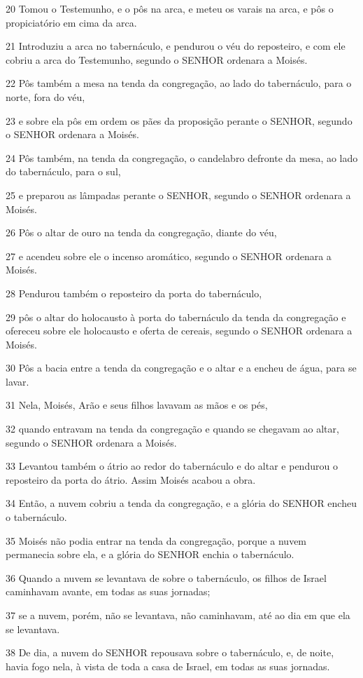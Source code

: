\par 20 Tomou o Testemunho, e o pôs na arca, e meteu os varais na arca, e pôs o propiciatório em cima da arca.
\par 21 Introduziu a arca no tabernáculo, e pendurou o véu do reposteiro, e com ele cobriu a arca do Testemunho, segundo o SENHOR ordenara a Moisés.
\par 22 Pôs também a mesa na tenda da congregação, ao lado do tabernáculo, para o norte, fora do véu,
\par 23 e sobre ela pôs em ordem os pães da proposição perante o SENHOR, segundo o SENHOR ordenara a Moisés.
\par 24 Pôs também, na tenda da congregação, o candelabro defronte da mesa, ao lado do tabernáculo, para o sul,
\par 25 e preparou as lâmpadas perante o SENHOR, segundo o SENHOR ordenara a Moisés.
\par 26 Pôs o altar de ouro na tenda da congregação, diante do véu,
\par 27 e acendeu sobre ele o incenso aromático, segundo o SENHOR ordenara a Moisés.
\par 28 Pendurou também o reposteiro da porta do tabernáculo,
\par 29 pôs o altar do holocausto à porta do tabernáculo da tenda da congregação e ofereceu sobre ele holocausto e oferta de cereais, segundo o SENHOR ordenara a Moisés.
\par 30 Pôs a bacia entre a tenda da congregação e o altar e a encheu de água, para se lavar.
\par 31 Nela, Moisés, Arão e seus filhos lavavam as mãos e os pés,
\par 32 quando entravam na tenda da congregação e quando se chegavam ao altar, segundo o SENHOR ordenara a Moisés.
\par 33 Levantou também o átrio ao redor do tabernáculo e do altar e pendurou o reposteiro da porta do átrio. Assim Moisés acabou a obra.
\par 34 Então, a nuvem cobriu a tenda da congregação, e a glória do SENHOR encheu o tabernáculo.
\par 35 Moisés não podia entrar na tenda da congregação, porque a nuvem permanecia sobre ela, e a glória do SENHOR enchia o tabernáculo.
\par 36 Quando a nuvem se levantava de sobre o tabernáculo, os filhos de Israel caminhavam avante, em todas as suas jornadas;
\par 37 se a nuvem, porém, não se levantava, não caminhavam, até ao dia em que ela se levantava.
\par 38 De dia, a nuvem do SENHOR repousava sobre o tabernáculo, e, de noite, havia fogo nela, à vista de toda a casa de Israel, em todas as suas jornadas.


